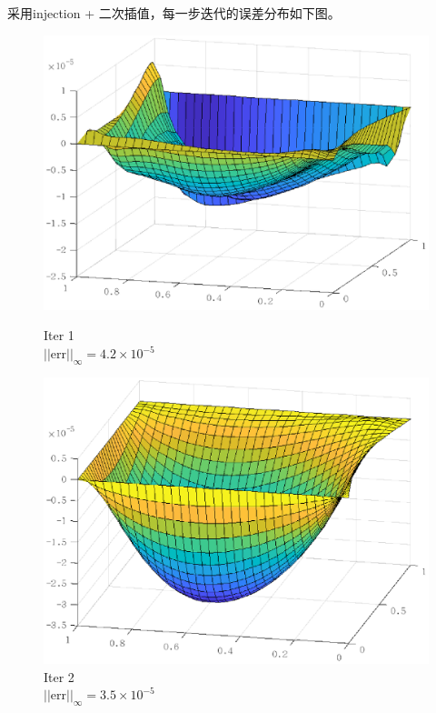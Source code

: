 \documentclass[lang=cn,10pt]{elegantbook}
\begin{document}
采用injection + 二次插值，每一步迭代的误差分布如下图。
\begin{figure}[H]
  \centering
  \begin{minipage}[t]{0.22\linewidth}
      \centering
      \includegraphics[width=0.9\linewidth]{figure/3-5-7.eps}
      \caption*{\small Iter 1 \\ $||\text{err}||_\infty=4.2\times 10^{-5}$}
  \end{minipage}
  \hspace{1em}
  \begin{minipage}[t]{0.22\linewidth}
    \centering
    \includegraphics[width=0.9\linewidth]{figure/3-5-8.eps}
    \caption*{\small Iter 2 \\ $||\text{err}||_\infty=3.5\times 10^{-5}$}
  \end{minipage}
\end{figure}
\end{document}
